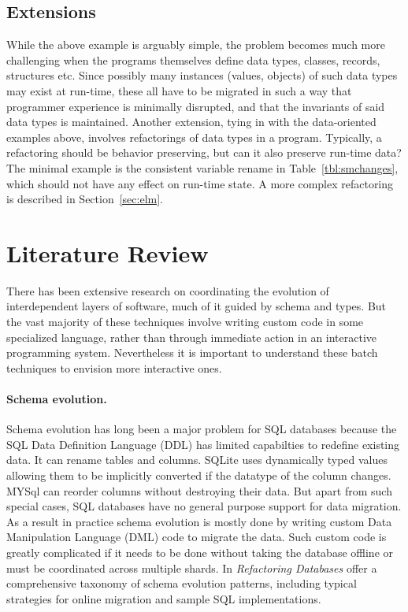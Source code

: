 \documentclass[english,submission]{programming}
\begin{document}
\subsection{Extensions}

While the above example is arguably simple, the problem becomes much more challenging when the programs themselves define data types, classes, records, structures etc. Since possibly many instances (values, objects) of such data types may exist at run-time, these all have to be migrated in such a way that programmer experience is minimally disrupted, and that the invariants of said data types is maintained.
Another extension, tying in with the data-oriented examples above, involves refactorings of data types in a program. Typically, a refactoring should be behavior preserving, but can it also preserve run-time data? The minimal example is the consistent variable rename in Table~\ref{tbl:smchanges}, which should not have any effect on run-time state.  A more complex refactoring is described in Section~\ref{sec:elm}.


\newpage
\appendix

\section{Literature Review}
\label{sec:related}

There has been extensive research on coordinating the evolution of interdependent layers of software, much of it guided by schema and types. But the vast majority of these techniques involve writing custom code in some specialized language, rather than through immediate action in an interactive programming system. Nevertheless it is important to understand these batch techniques to envision more interactive ones.

\paragraph{Schema evolution.}
Schema evolution has long been a major problem for SQL databases because
the SQL Data Definition Language (DDL) has limited capabilties to redefine existing data. It can rename tables and columns. SQLite \cite{sqliteDatatypes} uses dynamically typed values allowing them to be implicitly converted if the datatype of the column changes.
MYSql \cite{mysqlAlterTable} can reorder columns without destroying their data. But apart from such special cases, SQL databases have no general purpose support for data migration. As a result in practice schema evolution is mostly done by writing custom Data Manipulation Language (DML) code to migrate the data. Such custom code is greatly complicated if it needs to be done without taking the database offline or must be coordinated across multiple shards.
In \emph{Refactoring Databases} \citet{ambler06} offer a comprehensive taxonomy of schema evolution patterns, including typical strategies for online migration and sample SQL implementations.
\end{document}
